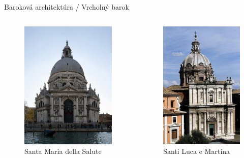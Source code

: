 \documentclass[dvipsnames]{beamer}
\begin{document}
\begin{frame}{\small \textcolor{g}{Baroková architektúra} / \Large Vrcholný barok}
\begin{itemize}
\begin{columns}
\begin{figure}
				\includegraphics[scale=0.225]{salute}
				\caption{Santa Maria della Salute}
			\end{figure}%
			\begin{figure}
				\includegraphics[scale=0.225]{slem}
				\caption{ Santi Luca e Martina}
			\end{figure}


		\end{columns}
	\end{itemize}
\end{frame}
\end{document}
